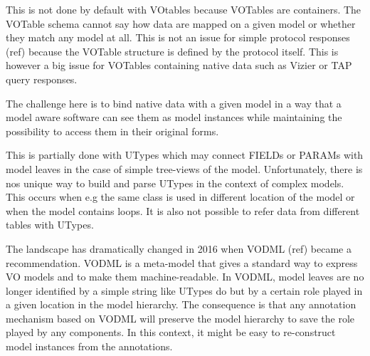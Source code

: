 \documentclass[11pt,a4paper]{ivoa}
\begin{document}
This is not done by default with VOtables because VOTables are containers. The VOTable schema cannot say how data are mapped on a given model or whether they match any model at all. This is not an issue for simple protocol responses (ref) because the VOTable structure is defined by the protocol itself. This is however a big issue for VOTables containing native data such as Vizier  or TAP query responses.

The challenge here is to bind native data with a given model in a way that a model aware software can see them as model instances while maintaining the possibility to access them in their original forms.

This is partially done with UTypes which may connect FIELDs or PARAMs with model leaves in the case of simple tree-views of the model. Unfortunately, there is nos unique  way to build and parse UTypes in the context of complex models. This occurs when e.g the same class is used in different location of the model or when the model contains loops. It is also not possible to refer data from different tables with  UTypes.


The landscape has dramatically changed in 2016 when VODML (ref) became a recommendation. VODML is a meta-model that gives a standard way to express VO models and to make them machine-readable.
In VODML, model leaves are no longer identified by a simple string like UTypes do but by a certain role played in a given location in the model hierarchy.
The consequence is that any annotation mechanism based on VODML will preserve the model hierarchy to save the role played by any components. In this context, it might be easy to re-construct model instances from the annotations. 
\end{document}
